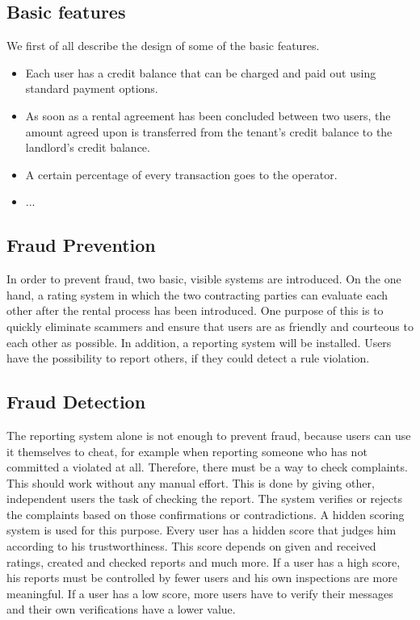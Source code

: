\documentclass[
a4paper,     %
titlepage,   %
14pt         %
]{scrartcl}  %
\theoremstyle{mystyle}
\begin{document}
\subsection{Basic features}
We first of all describe the design of some of the basic features.
\begin{itemize}
\item Each user has a credit balance that can be charged and paid out using standard payment options.
\item As soon as a rental agreement has been concluded between two users, the amount agreed upon is transferred from the tenant's credit balance to the landlord's credit balance.
\item A certain percentage of every transaction goes to the operator.
\item ...
\end{itemize}
  

\subsection{Fraud Prevention}
In order to prevent fraud, two basic, visible systems are introduced. On the one hand, a rating system in which the two contracting parties can evaluate each other after the rental process has been introduced. One purpose of this is to quickly eliminate scammers and ensure that users are as friendly and courteous to each other as possible. In addition, a reporting system will be installed. Users have the possibility to report others, if they could detect a rule violation.

\subsection{Fraud Detection}
The reporting system alone is not enough to prevent fraud, because users can use it themselves to cheat, for example when reporting someone who has not committed a violated at all. Therefore, there must be a way to check complaints. This should work without any manual effort. This is done by giving other, independent users the task of checking the report. The system verifies or rejects the complaints based on those confirmations or contradictions. A hidden scoring system is used for this purpose. Every user has a hidden score that judges him according to his trustworthiness. This score depends on given and received ratings, created and checked reports and much more. If a user has a high score, his reports must be controlled by fewer users and his own inspections are more meaningful. If a user has a low score, more users have to verify their messages and their own verifications have a lower value. 
\end{document}
